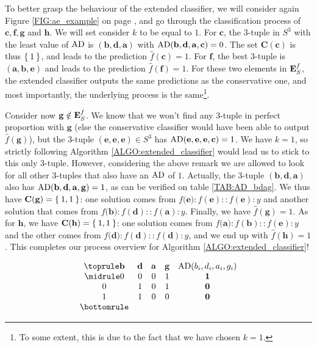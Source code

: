 \begin{testexample}
To better grasp the behaviour of the extended classifier, we will consider
again Figure \ref{FIG:ae_example} on page \pageref{FIG:ae_example}, and go
through the classification process of $\mathbf{c}, \mathbf{f}, \mathbf{g}$ and
$\mathbf{h}$. We will set consider $k$ to be equal to $1$. For $\mathbf{c}$,
the $3$-tuple in $S^3$ with the least value of $\text{AD}$ is $(\mathbf{b},
\mathbf{d}, \mathbf{a})$ with $\text{AD}(\mathbf{b},\mathbf{d}, \mathbf{a},
\mathbf{c}) = 0$. The set $\mathbf{C}(\mathbf{c})$ is thus $\Set{1}$, and leads
to the prediction $\hat{f}(\mathbf{c}) = 1$. For $\mathbf{f}$, the best
$3$-tuple is $(\mathbf{a}, \mathbf{b}, \mathbf{e})$ and leads to the prediction
$\hat{f}(\mathbf{f}) = 1$. For these two elements in $\mathbf{E}_{S}^{f}$, the extended
classifier outputs the same predictions as the conservative one, and most
importantly, the underlying process is the same\footnote{To some extent, this
is due to the fact that we have chosen $k = 1$.}.

Consider now $\mathbf{g} \notin \mathbf{E}_{S}^{f}$. We know that we won't find any $3$-tuple
in perfect proportion with $\mathbf{g}$ (else the conservative classifier would
have been able to output $\hat{f}(\mathbf{g})$), but the $3$-tuple
$(\mathbf{e}, \mathbf{e}, \mathbf{e}) \in S^3$ has $\text{AD}(\mathbf{e}, \mathbf{e},
\mathbf{e}, \mathbf{c}) = 1$. We have $k = 1$, so strictly following Algorithm
\ref{ALGO:extended_classifier} would lead us to stick to this only $3$-tuple.
However, considering the above remark we are allowed to look for all other
$3$-tuples that also have an $\text{AD}$ of $1$. Actually, the $3$-tuple
$(\mathbf{b}, \mathbf{d}, \mathbf{a})$ also has $\AD(\mathbf{b},\mathbf{d},
\mathbf{a}, \mathbf{g}) = 1$, as can be verified on table \ref{TAB:AD_bdag}. We
thus have $\mathbf{C}(\mathbf{g}) = \Set{1, 1}$: one solution comes from
$f(\mathbf{e)} :f(\mathbf{e}):: f(\mathbf{e}) : y$ and another solution that
comes from $f(\mathbf{b)} :f(\mathbf{d}):: f(\mathbf{a}) : y$.  Finally, we
have $\hat{f}(\mathbf{g}) = 1$. As for $\mathbf{h}$, we have
$\mathbf{C}(\mathbf{h}) = \Set{1, 1}$: one solution comes from $f(\mathbf{a)}
:f(\mathbf{b}):: f(\mathbf{e}) : y$ and the other comes from $f(\mathbf{d)}
:f(\mathbf{d}):: f(\mathbf{d}) : y$, and we end up with $\hat{f}(\mathbf{h}) =
1$. This completes our process overview for Algorithm
\ref{ALGO:extended_classifier}!
\end{testexample}

\begin{table}[t]
  \centering
  $$
  \begin{array}{ccccc}
    \toprule
    \mathbf{b} & \mathbf{d} & \mathbf{a} & \mathbf{g} &  \AD(b_i, d_i, a_i, g_i)\\
    \midrule
    0 & 0 & 0 & 1 &   \textbf{1}\\
    0 & 1 & 0 & 1 &   \textbf{0}\\
    1 & 1 & 0 & 0 &   \textbf{0}\\
    \bottomrule
  \end{array}
  $$
  \caption{$\AD(\mathbf{b}, \mathbf{d}, \mathbf{a}, \mathbf{g}) = 1$.}
  \label{TAB:AD_bdag}
\end{table}

